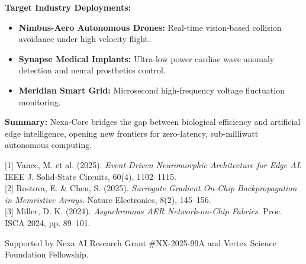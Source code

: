 \documentclass[final]{beamer}
\begin{document}
\begin{frame}[t]
\begin{minipage}[t]{0.31\textwidth}
  \begin{tcolorbox}[emeraldbox, title={\faRocket \;\; Commercial Applications \& Conclusion}]
    \textbf{\textcolor{TextWhite}{Target Industry Deployments:}}
    \begin{itemize}
      \item[\textcolor{BorderEmerald}{\faCheckCircle}] \textbf{Nimbus-Aero Autonomous Drones:} Real-time vision-based collision avoidance under high velocity flight.
      \item[\textcolor{BorderEmerald}{\faCheckCircle}] \textbf{Synapse Medical Implants:} Ultra-low power cardiac wave anomaly detection and neural prosthetics control.
      \item[\textcolor{BorderEmerald}{\faCheckCircle}] \textbf{Meridian Smart Grid:} Microsecond high-frequency voltage fluctuation monitoring.
    \end{itemize}

    \vspace{6pt}
    \textbf{\textcolor{TextWhite}{Summary:}} Nexa-Core bridges the gap between biological efficiency and artificial edge intelligence, opening new frontiers for zero-latency, sub-milliwatt autonomous computing.
  \end{tcolorbox}

  \vspace{15pt}

  \begin{tcolorbox}[posterbox, title={\faGraduationCap \;\; References \& Acknowledgments}]
    {\footnotesize \textcolor{TextMuted}{%
      [1] Vance, M. et al. (2025). \emph{Event-Driven Neuromorphic Architecture for Edge AI}. IEEE J. Solid-State Circuits, 60(4), 1102--1115.\\[3pt]
      [2] Rostova, E. \& Chen, S. (2025). \emph{Surrogate Gradient On-Chip Backpropagation in Memristive Arrays}. Nature Electronics, 8(2), 145--156.\\[3pt]
      [3] Miller, D. K. (2024). \emph{Asynchronous AER Network-on-Chip Fabrics}. Proc. ISCA 2024, pp. 89--101.%
    }}

    \vspace{6pt}
    \textcolor{TextMuted}{\tiny Supported by Nexa AI Research Grant \#NX-2025-99A and Vertex Science Foundation Fellowship.}
  \end{tcolorbox}
\end{minipage}

\end{frame}
\end{document}

